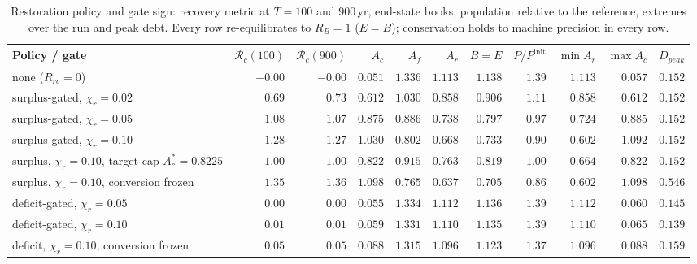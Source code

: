 \begin{table}[htbp]
\centering\scriptsize
\setlength{\tabcolsep}{2.5pt}
\caption{Restoration policy and gate sign: recovery metric at $T=100$ and $900$\,yr, end-state books, population relative to the reference, extremes over the run and peak debt. Every row re-equilibrates to $R_B=1$ ($E=B$); conservation holds to machine precision in every row.}
\label{tab:si_gates}
\begin{tabular}{l r r r r r r r r r r}
\toprule
Policy / gate & $\mathcal R_c(100)$ & $\mathcal R_c(900)$ & $A_c$ & $A_f$ & $A_r$ & $B=E$ & $P/P^{\mathrm{init}}$ & $\min A_r$ & $\max A_c$ & $D_{peak}$ \\
\midrule
none ($R_{rc}=0$) & $-0.00$ & $-0.00$ & $0.051$ & $1.336$ & $1.113$ & $1.138$ & $1.39$ & $1.113$ & $0.057$ & $0.152$ \\
surplus-gated, $\chi_r=0.02$ & $0.69$ & $0.73$ & $0.612$ & $1.030$ & $0.858$ & $0.906$ & $1.11$ & $0.858$ & $0.612$ & $0.152$ \\
surplus-gated, $\chi_r=0.05$ & $1.08$ & $1.07$ & $0.875$ & $0.886$ & $0.738$ & $0.797$ & $0.97$ & $0.724$ & $0.885$ & $0.152$ \\
surplus-gated, $\chi_r=0.10$ & $1.28$ & $1.27$ & $1.030$ & $0.802$ & $0.668$ & $0.733$ & $0.90$ & $0.602$ & $1.092$ & $0.152$ \\
surplus, $\chi_r=0.10$, target cap $A_c^*=0.8225$ & $1.00$ & $1.00$ & $0.822$ & $0.915$ & $0.763$ & $0.819$ & $1.00$ & $0.664$ & $0.822$ & $0.152$ \\
surplus, $\chi_r=0.10$, conversion frozen & $1.35$ & $1.36$ & $1.098$ & $0.765$ & $0.637$ & $0.705$ & $0.86$ & $0.602$ & $1.098$ & $0.546$ \\
deficit-gated, $\chi_r=0.05$ & $0.00$ & $0.00$ & $0.055$ & $1.334$ & $1.112$ & $1.136$ & $1.39$ & $1.112$ & $0.060$ & $0.145$ \\
deficit-gated, $\chi_r=0.10$ & $0.01$ & $0.01$ & $0.059$ & $1.331$ & $1.110$ & $1.135$ & $1.39$ & $1.110$ & $0.065$ & $0.139$ \\
deficit, $\chi_r=0.10$, conversion frozen & $0.05$ & $0.05$ & $0.088$ & $1.315$ & $1.096$ & $1.123$ & $1.37$ & $1.096$ & $0.088$ & $0.159$ \\
\bottomrule
\end{tabular}
\end{table}

